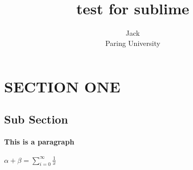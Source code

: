 \documentclass[10pt]{article}
\author{Jack\\
		Paring University}
\date{}
\title{test for sublime}
\begin{document}
\maketitle
\section*{SECTION ONE}
\subsection*{Sub Section}
\paragraph{This is a paragraph}
$\alpha+\beta=\sum_{i=0}^{\infty} \frac{1}{x}$
\end{document}
